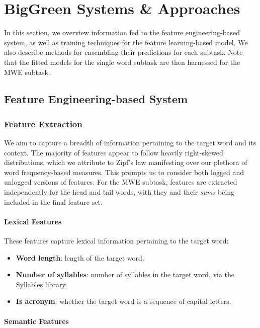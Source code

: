 \documentclass{dcthesis}
\theoremstyle{definition}
\theoremstyle{remark}
\begin{document}
\chapter{BigGreen Systems \& Approaches}

In this section, we overview information fed to the feature engineering-based system, as well as training techniques for the feature learning-based model. We also describe methods for ensembling their predictions for each subtask. Note that the fitted models for the single word subtask are then harnessed for the MWE subtask.

\section{Feature Engineering-based System}

\subsection{Feature Extraction}

We aim to capture a breadth of information pertaining to the target word and its context. The majority of features appear to follow heavily right-skewed distributions, which we attribute to Zipf's law manifesting over our plethora of word frequency-based measures. This prompts us to consider both logged and unlogged versions of features. For the MWE subtask, features are extracted independently for the head and tail words, with they and their \textit{sums} being included in the final feature set.

\subsubsection{Lexical Features}

These features capture lexical information pertaining to the target word:

\begin{itemize}
  \item \textbf{Word length}: length of the target word.
  \item \textbf{Number of syllables}: number of syllables in the target word, via the Syllables library.
  \item \textbf{Is acronym}: whether the target word is a sequence of capital letters.
\end{itemize}
  
\subsubsection{Semantic Features}
\end{document}
